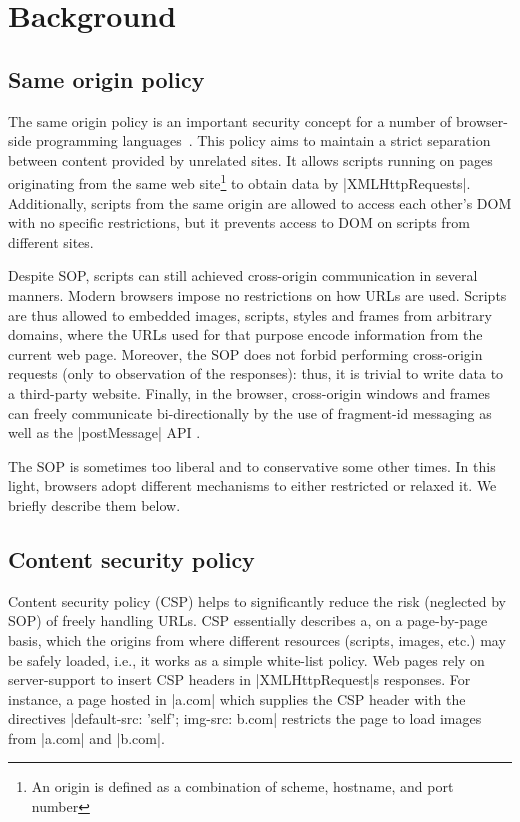 \section{Background}
\label{sec:background}



\subsection {Same origin policy}

The same origin policy is an important security concept for a number of
browser-side programming languages~\cite{TODO}. This policy aims to maintain a strict
separation between content provided by unrelated sites. It allows scripts
running on pages originating from the same web site\footnote{An origin is 
defined as a combination of scheme, hostname, and port number} to obtain data
by \js|XMLHttpRequests|. Additionally, scripts from the same origin are allowed to
access each other's DOM with no specific restrictions, but it prevents access to
DOM on scripts from different sites. 

Despite SOP, scripts can still achieved cross-origin communication in several
manners. Modern browsers impose no restrictions on how URLs are used. Scripts
are thus allowed to embedded images, scripts, styles and frames from arbitrary
domains, where the URLs used for that purpose encode information from the
current web page. Moreover, the SOP does not forbid performing cross-origin
requests (only to observation of the responses): thus, it is trivial to write
data to a third-party website. Finally, in the browser, cross-origin windows and
frames can freely communicate bi-directionally by the use of fragment-id \cite{TODO}
messaging as well as the \js|postMessage| API \cite{TODO}.

The SOP is sometimes too liberal and to conservative some other times. In this
light, browsers adopt different mechanisms to either restricted or relaxed it.
We briefly describe them below. 

\subsection {Content security policy} 

Content security policy  (CSP) \cite{TODO} helps to significantly reduce
the risk (neglected by SOP) of freely handling URLs. CSP essentially describes
a, on a page-by-page basis, which the origins from where different resources
(scripts, images, etc.) may be safely loaded, i.e., it works as a simple
white-list policy.  Web pages rely on server-support to insert CSP headers in
\js|XMLHttpRequest|s responses. For instance, a page hosted in \js|a.com| 
which supplies the CSP header with the directives 
%
\js|default-src: ’self’; img-src: b.com| 
%
restricts the page to load images from \js|a.com| and \js|b.com|.



